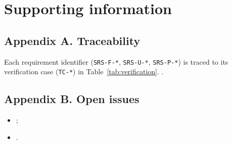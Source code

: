 \documentclass[12pt,a4paper]{extarticle}
\begin{document}
\clearpage

\section{Supporting information}
\label{sec:supporting}

\subsection*{Appendix A. Traceability}

Each requirement identifier (\texttt{SRS-F-*}, \texttt{SRS-U-*},
\texttt{SRS-P-*}) is traced to its verification case (\texttt{TC-*}) in
Table~\ref{tab:verification}. .

\subsection*{Appendix B. Open issues}

\begin{itemize}[leftmargin=1.25cm]
    \item {};
    \item {}.
\end{itemize}
\end{document}
